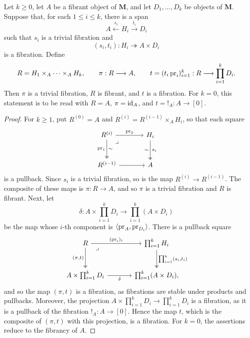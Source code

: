 \documentclass[10pt,reqno]{amsart}
\begin{document}
\begin{lemma}
\label{lem:common_source_fibrations}
Let $k\geq 0$, let $A$ be a fibrant object of $\mathbf M$, and let $D_1,\ldots,D_k$ be objects of $\mathbf M$. Suppose that, for each $1\leq i\leq k$, there is a span
\[
A\xleftarrow{\ s_i\ }H_i\xrightarrow{\ t_i\ }D_i
\]
such that $s_i$ is a trivial fibration and
\[
(s_i,t_i):H_i\twoheadrightarrow A\times D_i
\]
is a fibration. Define
\[
R=H_1\times_A\cdots\times_A H_k,
\qquad
\pi:R\longrightarrow A,
\qquad
t=(t_i\operatorname{pr}_i)_{i=1}^k:
R\longrightarrow\prod_{i=1}^k D_i.
\]
Then $\pi$ is a trivial fibration, $R$ is fibrant, and $t$ is a
fibration. For $k=0$, this statement is to be read with $R=A$,
$\pi=\operatorname{id}_A$, and $t={!_A}:A\rightarrow[0]$.
\end{lemma}

\begin{proof}
For $k\geq1$, put $R^{(0)}=A$ and
$R^{(i)}=R^{(i-1)}\times_A H_i$, so that each square
\[
\begin{tikzcd}[ampersand replacement=\&, sep=large]
R^{(i)} \arrow[r,"\pr_2"] \arrow[d,two heads,"\pr_1"',"\sim"]
  \arrow[dr,phantom,"\lrcorner",very near start]
\& H_i \arrow[d,two heads,"s_i","\sim"']\\
R^{(i-1)} \arrow[r]
\& A
\end{tikzcd}
\]
is a pullback. Since $s_i$ is a trivial fibration, so is the map
$R^{(i)}\to R^{(i-1)}$. The composite of these maps is
$\pi:R\to A$, and so $\pi$ is a trivial fibration and $R$ is
fibrant. Next, let
\[
\delta:A\times\prod_{i=1}^kD_i
  \longrightarrow\prod_{i=1}^k(A\times D_i)
\]
be the map whose $i$-th component is
$\langle\operatorname{pr}_A,\operatorname{pr}_{D_i}\rangle$. There is a pullback square
\[
\begin{tikzcd}[ampersand replacement=\&, sep=large]
R \arrow[r,"{(\pr_i)_i}"] \arrow[d,two heads,"{(\pi,t)}"']
  \arrow[dr,phantom,"\lrcorner",very near start]
\& \prod_{i=1}^kH_i
  \arrow[d,two heads,"{\prod_{i=1}^k(s_i,t_i)}"]\\
A\times\prod_{i=1}^kD_i \arrow[r,"\delta"']
\& \prod_{i=1}^k(A\times D_i),
\end{tikzcd}
\]
and so the map $(\pi,t)$ is a fibration, as fibrations are stable
under products and pullbacks. Moreover, the projection
$A\times\prod_{i=1}^kD_i\to\prod_{i=1}^kD_i$ is a fibration, as it
is a pullback of the fibration $!_A:A\to[0]$. Hence the map $t$,
which is the composite of $(\pi,t)$ with this projection, is a
fibration. For $k=0$, the assertions reduce to the fibrancy of
$A$.
\end{proof}
\end{document}
